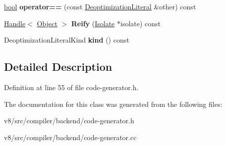 \begin{DoxyCompactItemize}
\item 
\mbox{\label{classv8_1_1internal_1_1compiler_1_1DeoptimizationLiteral_a199484a8d7c11b032516f7be5c23a3d8}} 
\mbox{\hyperlink{classbool}{bool}} {\bfseries operator==} (const \mbox{\hyperlink{classv8_1_1internal_1_1compiler_1_1DeoptimizationLiteral}{Deoptimization\+Literal}} \&other) const
\item 
\mbox{\label{classv8_1_1internal_1_1compiler_1_1DeoptimizationLiteral_afafcf488fe75a1708046d58fbb8da05a}} 
\mbox{\hyperlink{classv8_1_1internal_1_1Handle}{Handle}}$<$ \mbox{\hyperlink{classv8_1_1internal_1_1Object}{Object}} $>$ {\bfseries Reify} (\mbox{\hyperlink{classv8_1_1internal_1_1Isolate}{Isolate}} $\ast$isolate) const
\item 
\mbox{\label{classv8_1_1internal_1_1compiler_1_1DeoptimizationLiteral_a70552b58fd0c117cd584276f25759e77}} 
Deoptimization\+Literal\+Kind {\bfseries kind} () const
\end{DoxyCompactItemize}


\subsection{Detailed Description}


Definition at line 55 of file code-\/generator.\+h.



The documentation for this class was generated from the following files\+:\begin{DoxyCompactItemize}
\item 
v8/src/compiler/backend/code-\/generator.\+h\item 
v8/src/compiler/backend/code-\/generator.\+cc\end{DoxyCompactItemize}
